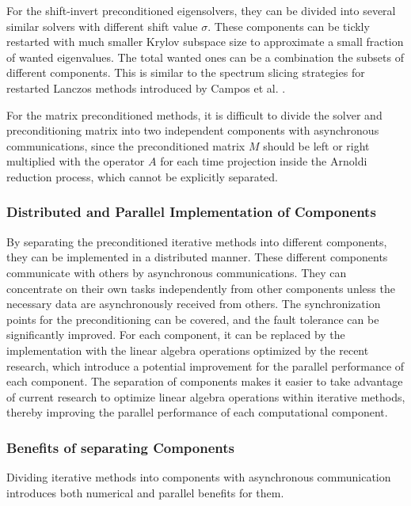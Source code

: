 For the shift-invert preconditioned eigensolvers, they can be divided into several similar solvers with different shift value $\sigma$. These components can be tickly restarted with much smaller Krylov subspace size to approximate a small fraction of wanted eigenvalues. The total wanted ones can be a combination the subsets of different components. This is similar to the spectrum slicing strategies for restarted Lanczos methods introduced by Campos et al. \cite{campos2012strategies}.

For the matrix preconditioned methods, it is difficult to divide the solver and preconditioning matrix into two independent components with asynchronous communications, since the preconditioned matrix $M$ should be left or right multiplied with the operator $A$ for each time projection inside the Arnoldi reduction process, which cannot be explicitly separated. 

\subsubsection{Distributed and Parallel Implementation of Components}

By separating the preconditioned iterative methods into different components, they can be implemented in a distributed manner. These different components communicate with others by asynchronous communications. They can concentrate on their own tasks independently from other components unless the necessary data are asynchronously received from others. The synchronization points for the preconditioning can be covered, and the fault tolerance can be significantly improved. For each component, it can be replaced by the implementation with the linear algebra operations optimized by the recent research, which introduce a potential improvement for the parallel performance of each component. The separation of components makes it easier to take advantage of current research to optimize linear algebra operations within iterative methods, thereby improving the parallel performance of each computational component.

\subsubsection{Benefits of separating Components}

Dividing iterative methods into components with asynchronous communication introduces both numerical and parallel benefits for them.

